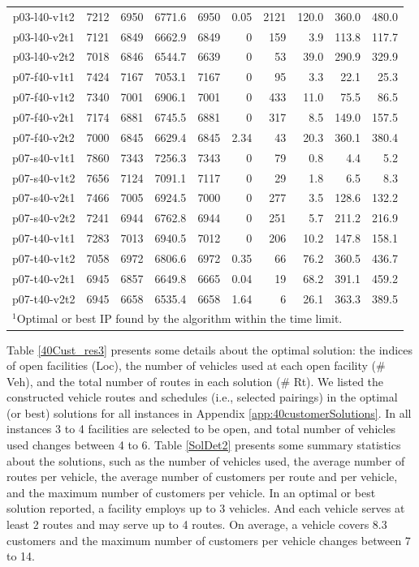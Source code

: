 \begin{table}[!htbp]
\begin {tabular}[!h]{|c|c|c|c|c|r|r|r|r|r|}
p03-l40-v1t2 &  7212 &  6950 &  6771.6  & 6950  & 0.05  & 2121  & 120.0 & 360.0 & 480.0 \\
p03-l40-v2t1 &  7121 &  6849 &  6662.9  & 6849  & 0 & 159   & 3.9   & 113.8 & 117.7 \\
p03-l40-v2t2 &  7018 &  6846 &  6544.7  & 6639  & 0 & 53    & 39.0  & 290.9 & 329.9 \\\hline
p07-f40-v1t1 &  7424 &  7167 &  7053.1  & 7167  & 0 & 95    & 3.3   & 22.1  & 25.3  \\
p07-f40-v1t2 &  7340 &  7001 &  6906.1  & 7001  & 0 & 433   & 11.0  & 75.5  & 86.5  \\
p07-f40-v2t1 &  7174 &  6881 &  6745.5  & 6881  & 0 & 317   & 8.5   & 149.0 & 157.5 \\
p07-f40-v2t2 &  7000 &  6845 &  6629.4  & 6845  & 2.34  & 43    & 20.3  & 360.1 & 380.4 \\\hline
p07-s40-v1t1 &  7860 &  7343 &  7256.3  & 7343  & 0 & 79    & 0.8   & 4.4   & 5.2   \\
p07-s40-v1t2 &  7656 &  7124 &  7091.1  & 7117  & 0 & 29    & 1.8   & 6.5   & 8.3   \\
p07-s40-v2t1 &  7466 &  7005 &  6924.5  & 7000  & 0 & 277   & 3.5   & 128.6 & 132.2 \\
p07-s40-v2t2 &  7241 &  6944 &  6762.8  & 6944  & 0 & 251   & 5.7   & 211.2 & 216.9 \\\hline
p07-t40-v1t1 &  7283 &  7013 &  6940.5  & 7012  & 0 & 206   & 10.2  & 147.8 & 158.1 \\
p07-t40-v1t2 &  7058 &  6972 &  6806.6  & 6972  & 0.35  & 66    & 76.2  & 360.5 & 436.7 \\
p07-t40-v2t1 &  6945 &  6857 &  6649.8  & 6665  & 0.04  & 19    & 68.2  & 391.1 & 459.2 \\
p07-t40-v2t2 &  6945 &  6658 &  6535.4  & 6658  & 1.64  & 6 & 26.1  & 363.3 & 389.5 \\\hline
\multicolumn{10}{l}{$^1$Optimal or best IP found by the algorithm within the time limit.}\\
\end{tabular}
\end{table}

Table  \ref{40Cust_res3} presents some details about the optimal solution: the indices of
open facilities (Loc), the number of vehicles used at each open facility (\# Veh), and the
total number of routes in each solution (\# Rt). We listed the constructed vehicle routes
and schedules (i.e., selected pairings) in the optimal (or best) solutions for all instances
in Appendix \ref{app:40customerSolutions}. In all instances 3 to 4 facilities are selected to
be open, and total number of vehicles used changes between 4 to 6. Table \ref{SolDet2}
presents some summary statistics about the solutions, such as the number of vehicles used,
the average number of routes per vehicle, the average number of customers per route and
per vehicle, and the maximum number of customers per vehicle. In an optimal or best solution
reported, a facility employs up to 3 vehicles. And each vehicle serves at least 2 routes
and may serve up to 4 routes. On average, a vehicle covers 8.3 customers and the maximum
number of customers per vehicle changes between 7 to 14.

